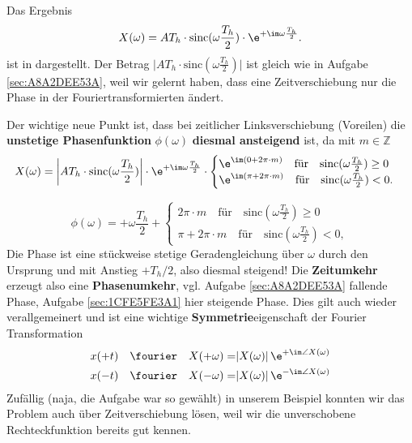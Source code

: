 \begin{Loesung}
Das Ergebnis
\begin{equation}
\label{eq:1CFE5FE3A1_Loesung}
X(\omega) = A T_h \cdot \mathrm{sinc}(\omega\frac{T_h}{2}) \cdot  \e^{+\im\omega\frac{T_h}{2}}.
\end{equation}
ist in  dargestellt. Der Betrag
$\bigg|A T_h \cdot \mathrm{sinc}(\omega\frac{T_h}{2})\bigg|$
ist gleich wie in Aufgabe \ref{sec:A8A2DEE53A}, weil wir gelernt haben, dass
eine Zeitverschiebung nur die Phase in der Fouriertransformierten ändert.
%

Der wichtige neue Punkt ist, dass bei zeitlicher Linksverschiebung (Voreilen)
die \textbf{unstetige Phasenfunktion} $\phi(\omega)$
\textbf{diesmal ansteigend} ist,  da mit $m\in\mathbb{Z}$
\begin{equation}
X(\omega) = \bigg|A T_h \cdot \mathrm{sinc}(\omega\frac{T_h}{2})\bigg|
\cdot  \e^{+\im\omega\frac{T_h}{2}}\cdot
\begin{cases}
\e^{\im (0+2\pi \cdot m)}\quad \text{für}\quad \mathrm{sinc}(\omega\frac{T_h}{2})\geq0\\
\e^{\im (\pi + 2\pi \cdot m)}\quad \text{für}\quad\mathrm{sinc}(\omega\frac{T_h}{2})<0.
\end{cases}
\end{equation}

\begin{equation}
\phi(\omega) = +\omega\frac{T_h}{2} +
\begin{cases}
2\pi \cdot m\quad \text{für}\quad \mathrm{sinc}(\omega\frac{T_h}{2})\geq0\\
\pi + 2\pi \cdot m\quad \text{für}\quad\mathrm{sinc}(\omega\frac{T_h}{2})<0,
\end{cases}
\end{equation}
Die Phase ist eine stückweise stetige Geradengleichung über $\omega$ durch den
Ursprung und mit Anstieg $+T_h/2$, also diesmal steigend!
%
Die \textbf{Zeitumkehr} erzeugt also eine \textbf{Phasenumkehr}, vgl.
Aufgabe \ref{sec:A8A2DEE53A} fallende Phase, Aufgabe \ref{sec:1CFE5FE3A1} hier steigende Phase.
%
Dies gilt auch wieder verallgemeinert und ist eine wichtige \textbf{Symmetrie}eigenschaft
der Fourier Transformation
%
\begin{align}
x(+t) \quad \fourier \quad X(+\omega) =& |X(\omega)| \, \e^{+\im\angle X(\omega)}\\
x(-t) \quad \fourier \quad X(-\omega) =& |X(\omega)| \, \e^{-\im\angle X(\omega)}
\end{align}
%
Zufällig (naja, die Aufgabe war so gewählt)
in unserem Beispiel konnten wir das Problem auch über Zeitverschiebung
lösen, weil wir die unverschobene Rechteckfunktion bereits gut kennen.
\end{Loesung}

